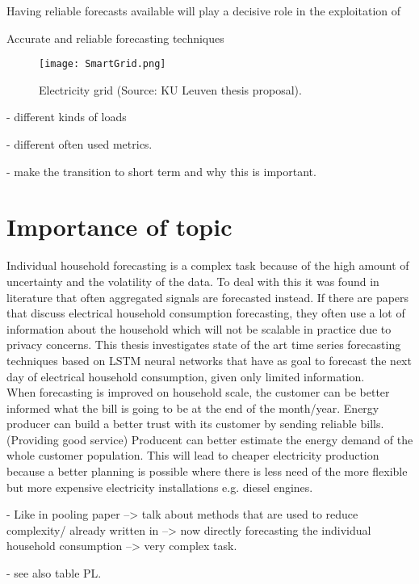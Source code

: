 Having reliable forecasts available will play a decisive role in the exploitation of 


 Accurate and reliable forecasting techniques   




\begin{figure}[hb]
	\centering
	\texttt{[image: SmartGrid.png]}
	\caption{Electricity grid (Source: KU Leuven thesis proposal).}
	\label{fig:power_image}
\end{figure}


- different kinds of loads

- different often used metrics. 

- make the transition to short term and why this is important. 


\section{Importance of topic}
Individual household forecasting is a complex task because of the high amount of uncertainty
and the volatility of the data. To deal with this it was found in literature that often aggregated signals are forecasted instead. If there are papers that discuss electrical household consumption forecasting, they often use a lot of information about the household which will not be scalable in practice due to privacy concerns. This thesis investigates state of the art time series forecasting techniques based on LSTM neural networks that have as goal to forecast the next day of electrical household consumption, given only limited information.\\

When forecasting is improved on household scale, the customer can be better informed what the bill is going to be at the end of the month/year.
Energy producer can build a better trust with its customer by sending reliable bills. (Providing good service)
Producent can better estimate the energy demand of the whole customer population. This will lead to cheaper electricity production because a better planning is possible where there is less need of the more 
flexible but more expensive electricity installations e.g. diesel engines.

- Like in pooling paper --> talk about methods that are used to reduce complexity/ already written in --> now directly forecasting the individual household consumption --> very complex task. 


- see also table PL. 

